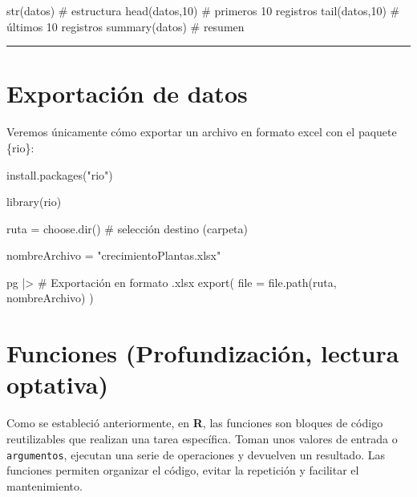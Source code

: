 \documentclass[
  spanish,
  letterpaper,
  DIV=11,
  numbers=noendperiod]{scrreprt}
\newenvironment{Shaded}{\begin{snugshade}}{\end{snugshade}}
\newcommand{\AttributeTok}[1]{\textcolor[rgb]{0.40,0.45,0.13}{#1}}
\newcommand{\CommentTok}[1]{\textcolor[rgb]{0.37,0.37,0.37}{#1}}
\newcommand{\DecValTok}[1]{\textcolor[rgb]{0.68,0.00,0.00}{#1}}
\newcommand{\FunctionTok}[1]{\textcolor[rgb]{0.28,0.35,0.67}{#1}}
\newcommand{\NormalTok}[1]{\textcolor[rgb]{0.00,0.23,0.31}{#1}}
\newcommand{\OtherTok}[1]{\textcolor[rgb]{0.00,0.23,0.31}{#1}}
\newcommand{\SpecialCharTok}[1]{\textcolor[rgb]{0.37,0.37,0.37}{#1}}
\newcommand{\StringTok}[1]{\textcolor[rgb]{0.13,0.47,0.30}{#1}}
\begin{document}
\begin{Shaded}
\begin{Highlighting}[]

\FunctionTok{str}\NormalTok{(datos) }\CommentTok{\# estructura}
\FunctionTok{head}\NormalTok{(datos,}\DecValTok{10}\NormalTok{) }\CommentTok{\# primeros 10 registros}
\FunctionTok{tail}\NormalTok{(datos,}\DecValTok{10}\NormalTok{) }\CommentTok{\# últimos 10 registros}
\FunctionTok{summary}\NormalTok{(datos) }\CommentTok{\# resumen}
\end{Highlighting}
\end{Shaded}

\begin{center}\rule{0.5\linewidth}{0.5pt}\end{center}

\section{Exportación de datos}\label{exportaciuxf3n-de-datos}

Veremos únicamente cómo exportar un archivo en formato excel con el
paquete \{rio\}:

\begin{Shaded}
\begin{Highlighting}[]

\FunctionTok{install.packages}\NormalTok{(}\StringTok{"rio"}\NormalTok{)}

\FunctionTok{library}\NormalTok{(rio)}

\NormalTok{ruta }\OtherTok{=} \FunctionTok{choose.dir}\NormalTok{() }\CommentTok{\# selección destino (carpeta)}

\NormalTok{nombreArchivo }\OtherTok{=} \StringTok{"crecimientoPlantas.xlsx"}

\NormalTok{pg }\SpecialCharTok{|\textgreater{}} \CommentTok{\# Exportación en formato .xlsx}
  \FunctionTok{export}\NormalTok{(}
    \AttributeTok{file =} \FunctionTok{file.path}\NormalTok{(ruta, nombreArchivo)}
\NormalTok{  )}
\end{Highlighting}
\end{Shaded}

\section{Funciones (Profundización, lectura
optativa)}\label{funciones-profundizaciuxf3n-lectura-optativa}

Como se estableció anteriormente, en \textbf{R}, las funciones son
bloques de código reutilizables que realizan una tarea específica. Toman
unos valores de entrada o \texttt{argumentos}, ejecutan una serie de
operaciones y devuelven un resultado. Las funciones permiten organizar
el código, evitar la repetición y facilitar el mantenimiento.
\end{document}
